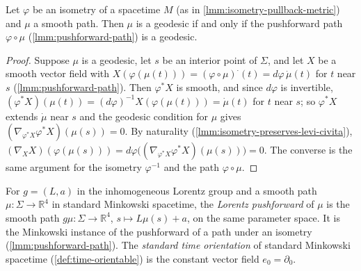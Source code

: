 \begin{lemma}
    \label{lmm:isometry-preserves-geodesics}
    \leanok
    Let $\varphi$ be an isometry of a spacetime $M$ (as in \ref{lmm:isometry-pullback-metric}) and $\mu$ a smooth path. Then $\mu$ is a geodesic if and only if the pushforward path $\varphi \circ \mu$ (\ref{lmm:pushforward-path}) is a geodesic.
\end{lemma}
\begin{proof}
    \leanok
    Suppose $\mu$ is a geodesic, let $s$ be an interior point of $\Sigma$, and let $X$ be a smooth vector field with $X(\varphi(\mu(t))) = (\varphi\circ\mu)^{\boldsymbol\cdot}(t) = d\varphi\,\dot\mu(t)$ for $t$ near $s$ (\ref{lmm:pushforward-path}). Then $\varphi^* X$ is smooth, and since $d\varphi$ is invertible, $(\varphi^* X)(\mu(t)) = (d\varphi)^{-1} X(\varphi(\mu(t))) = \dot\mu(t)$ for $t$ near $s$; so $\varphi^* X$ extends $\dot\mu$ near $s$ and the geodesic condition for $\mu$ gives $(\nabla_{\varphi^* X}\varphi^* X)(\mu(s)) = 0$. By naturality (\ref{lmm:isometry-preserves-levi-civita}), $(\nabla_X X)(\varphi(\mu(s))) = d\varphi\big((\nabla_{\varphi^* X}\varphi^* X)(\mu(s))\big) = 0$. The converse is the same argument for the isometry $\varphi^{-1}$ and the path $\varphi \circ \mu$.
\end{proof}

\begin{definition}
    \label{def:lorentz-path}
    \leanok
    For $g = (L, a)$ in the inhomogeneous Lorentz group and a smooth path $\mu : \Sigma \to \mathbb{R}^4$ in standard Minkowski spacetime, the \textit{Lorentz pushforward} of $\mu$ is the smooth path $g\mu : \Sigma \to \mathbb{R}^4$, $s \mapsto L\mu(s) + a$, on the same parameter space. It is the Minkowski instance of the pushforward of a path under an isometry (\ref{lmm:pushforward-path}). The \textit{standard time orientation} of standard Minkowski spacetime (\ref{def:time-orientable}) is the constant vector field $e_0 = \partial_0$.
\end{definition}

